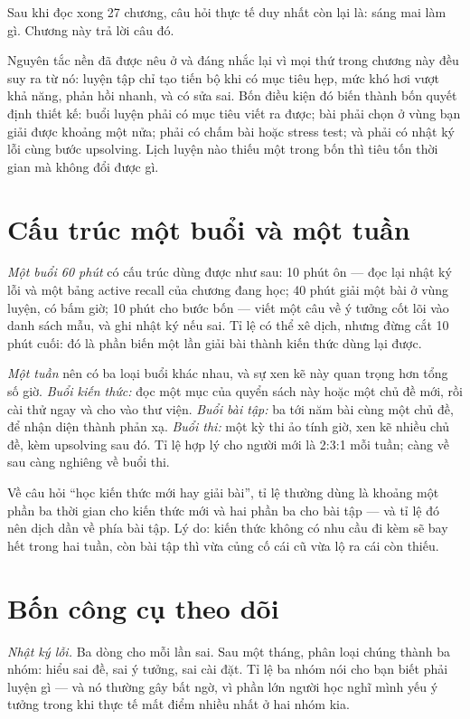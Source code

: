 \documentclass[../../algorithm.tex]{subfiles}
\begin{document}
Sau khi đọc xong 27 chương, câu hỏi thực tế duy nhất còn lại là: sáng mai làm gì. Chương này trả lời câu đó.

Nguyên tắc nền đã được nêu ở  và đáng nhắc lại vì mọi thứ trong chương này đều suy ra từ nó: luyện tập chỉ tạo tiến bộ khi có mục tiêu hẹp, mức khó hơi vượt khả năng, phản hồi nhanh, và có sửa sai. Bốn điều kiện đó biến thành bốn quyết định thiết kế: buổi luyện phải có mục tiêu viết ra được; bài phải chọn ở vùng bạn giải được khoảng một nửa; phải có chấm bài hoặc stress test; và phải có nhật ký lỗi cùng bước upsolving. Lịch luyện nào thiếu một trong bốn thì tiêu tốn thời gian mà không đổi được gì.

\section{Cấu trúc một buổi và một tuần}

\emph{Một buổi 60 phút} có cấu trúc dùng được như sau: 10 phút ôn --- đọc lại nhật ký lỗi và một bảng active recall của chương đang học; 40 phút giải một bài ở vùng luyện, có bấm giờ; 10 phút cho bước bốn --- viết một câu về ý tưởng cốt lõi vào danh sách mẫu, và ghi nhật ký nếu sai. Tỉ lệ có thể xê dịch, nhưng đừng cắt 10 phút cuối: đó là phần biến một lần giải bài thành kiến thức dùng lại được.

\emph{Một tuần} nên có ba loại buổi khác nhau, và sự xen kẽ này quan trọng hơn tổng số giờ. \emph{Buổi kiến thức:} đọc một mục của quyển sách này hoặc một chủ đề mới, rồi cài thử ngay và cho vào thư viện. \emph{Buổi bài tập:} ba tới năm bài cùng một chủ đề, để nhận diện thành phản xạ. \emph{Buổi thi:} một kỳ thi ảo tính giờ, xen kẽ nhiều chủ đề, kèm upsolving sau đó. Tỉ lệ hợp lý cho người mới là 2:3:1 mỗi tuần; càng về sau càng nghiêng về buổi thi.

Về câu hỏi ``học kiến thức mới hay giải bài'', tỉ lệ thường dùng là khoảng một phần ba thời gian cho kiến thức mới và hai phần ba cho bài tập --- và tỉ lệ đó nên dịch dần về phía bài tập. Lý do: kiến thức không có nhu cầu đi kèm sẽ bay hết trong hai tuần, còn bài tập thì vừa củng cố cái cũ vừa lộ ra cái còn thiếu.

\section{Bốn công cụ theo dõi}

\emph{Nhật ký lỗi.} Ba dòng cho mỗi lần sai. Sau một tháng, phân loại chúng thành ba nhóm: hiểu sai đề, sai ý tưởng, sai cài đặt. Tỉ lệ ba nhóm nói cho bạn biết phải luyện gì --- và nó thường gây bất ngờ, vì phần lớn người học nghĩ mình yếu ý tưởng trong khi thực tế mất điểm nhiều nhất ở hai nhóm kia.
\end{document}
